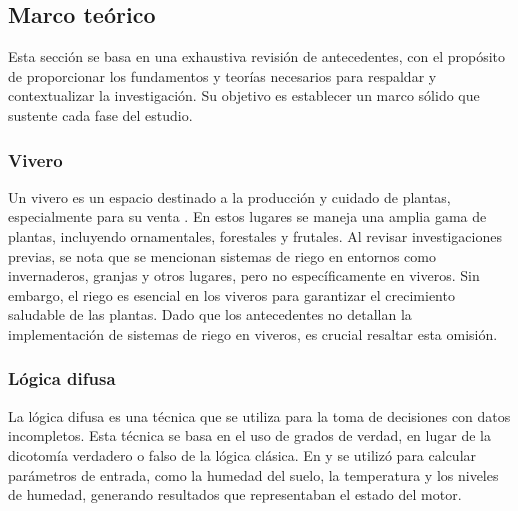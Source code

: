 \subsection{Marco teórico}

Esta sección se basa en una exhaustiva revisión de antecedentes, con el
propósito de proporcionar los fundamentos y teorías necesarios para respaldar y
contextualizar la investigación. Su objetivo es establecer un marco sólido que
sustente cada fase del estudio.

\subsubsection*{Vivero}
Un vivero es un espacio destinado a la producción y cuidado de plantas, especialmente para su venta \cite{peris_para_nodate}. En estos lugares se maneja una amplia gama de plantas, incluyendo ornamentales, forestales y frutales. Al revisar investigaciones previas, se nota que se mencionan sistemas de riego en entornos como invernaderos, granjas y otros lugares, pero no específicamente en viveros. Sin embargo, el riego es esencial en los viveros para garantizar el crecimiento saludable de las plantas. Dado que los antecedentes no detallan la implementación de sistemas de riego en viveros, es crucial resaltar esta omisión.

\subsubsection*{Lógica difusa}
La lógica difusa es una técnica que se utiliza para la toma de decisiones con datos incompletos. Esta técnica se basa en el uso de grados de verdad, en lugar de la dicotomía verdadero o falso de la lógica clásica. En \cite{lema_holguin_implementacion_2018} \cite{salazar_irrigation_2013} \cite{hasan_implementation_2018} \cite{munir_intelligent_2019} \cite{al-ali_iot-solar_2019} \cite{krishnan_fuzzy_2020} \cite{kumar_irrigation_2020} \cite{benyezza_zoning_2021} \cite{noauthor_fuzzy_2023} \cite{neugebauer_fuzzy_2023} y \cite{mohammed_intelligent_nodate}  se utilizó para calcular parámetros de entrada, como la humedad del suelo, la temperatura y los niveles de humedad, generando resultados que representaban el estado del motor.

